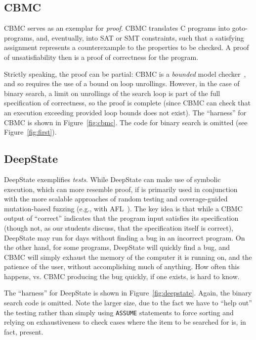 \documentclass[sigplan]{acmart}
\begin{document}
\subsection{CBMC}


CBMC serves as an exemplar for \emph{proof}.  CBMC
translates C programs into goto-programs, and, eventually, into SAT or
SMT constraints, such that a satisfying assignment represents a
counterexample to the properties to be checked.  A proof of
unsatisfiability then is a proof of correctness for the program.

Strictly speaking, the
proof can be partial: CBMC is a \emph{bounded} model checker~\cite{BMC}, and so
requires the use of a bound on loop unrollings.  However, in the case
of binary search, a limit on unrollings of the search loop is part of
the full specification of correctness, so the proof is complete (since
CBMC can check that an execution exceeding provided loop bounds does
not exist).  The ``harness'' for CBMC is shown in
Figure~\ref{fig:cbmc}.  The code for binary search is omitted (see
Figure~\ref{fig:first}).


\subsection{DeepState}

DeepState exemplifies \emph{tests}.  While DeepState can make use of
symbolic execution, which can more resemble proof, if is primarily
used in conjunction with the more scalable approaches of random
testing and coverage-guided mutation-based fuzzing (e.g., with AFL~\cite{aflfuzz}).  The key idea is that while a
CBMC output of ``correct'' indicates that the program input satisfies
its specification (though not, as our students discuss, that the
specification itself is correct), DeepState may run for days without
finding a bug in an incorrect program.  On the other hand, for some
programs, DeepState will quickly find a bug, and CBMC will simply
exhaust the memory of the computer it is running on, and the patience
of the user, without accomplishing much of anything.  How often this
happens, vs. CBMC producing the bug quickly, if one exists, is hard to
know.

The ``harness'' for DeepState is shown in Figure~\ref{fig:deepstate}.
Again, the binary search code is omitted.  Note the larger size, due to the fact we
have to ``help out'' the testing rather than simply using {\tt ASSUME}
statements to force sorting and relying on exhaustiveness to check cases
where the item to be searched for is, in fact, present.
\end{document}
